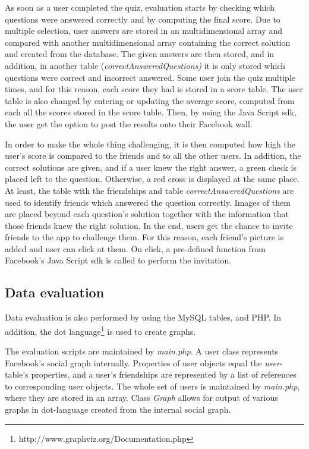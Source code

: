 \documentclass[preprint,12pt]{elsarticle}
\begin{document}
As soon as a user completed the quiz, evaluation starts by checking
which questions were answered correctly and by computing the final
score. Due to multiple selection, user answers are stored in
an multidimensional array and compared with another multidimensional
array containing the correct solution and created from the database.
The given answers are then stored, and in addition, in another table
(\textit{correctAnsweredQuestions)}
it is only stored which questions were correct and incorrect answered.
Some user join the quiz multiple times, and for this reason, each
score they had is stored in a score table. The user table is also
changed by entering or updating the average score, computed from each all the scores stored
in the score table. Then, by using the Java Script \ac{sdk}, the user
get the option to post the results onto their Facebook wall.

In order to make the whole thing challenging, it
is then computed how high the user's score is compared to the friends
and to all the other users. 
In addition, the correct solutions are given, and if a user knew the
right answer, a green check is placed left to the question. Otherwise,
a red cross is displayed at the same place. At least, the table with
the friendships and table \textit{correctAnsweredQuestions} are used
to identify friends  which answered the question correctly. Images of
them are placed beyond each question's solution together with the
information that those friends knew the right solution. 
In the end, users get the chance to invite friends to the app to
challenge them. For this reason, each friend's picture is added and
user can click at them. On click, a pre-defined function from
Facebook's Java Script \ac{sdk} is called to perform the invitation. 


\subsection{Data evaluation}
\label{sec:data-evaluation}
Data evaluation is also performed by using the MySQL tables, and
PHP. In addition, the dot
language\footnote{http://www.graphviz.org/Documentation.php} is used
to create graphs. 

The evaluation scripts are maintained by \textit{main.php}. A user
class represents Facebook's social graph internally. Properties of
user objects equal the \textit{user}-table's properties, and a user's
friendships are represented by a list of references to corresponding
user objects. The whole set of users is maintained by
\textit{main.php}, where they are stored in an array. Class \textit{Graph}
allows for output of various graphs in dot-language created from the
internal social graph. 
\end{document}
